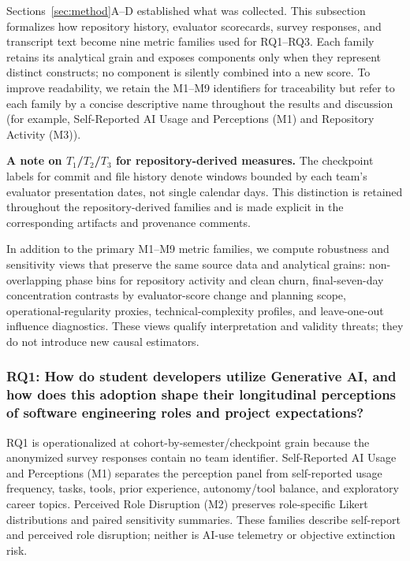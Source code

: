 Sections~\ref{sec:method}A--D established what was collected. This subsection
formalizes how repository history, evaluator scorecards, survey responses, and
transcript text become nine metric families used for RQ1--RQ3. Each family
retains its analytical grain and exposes components only when they represent
distinct constructs; no component is silently combined into a new score.
To improve readability, we retain the M1--M9 identifiers for traceability but
refer to each family by a concise descriptive name throughout the results and
discussion (for example, Self-Reported AI Usage and Perceptions (M1) and
Repository Activity (M3)).

\textbf{A note on $T_1$/$T_2$/$T_3$ for repository-derived measures.} The
checkpoint labels for commit and file history denote windows bounded by each
team's evaluator presentation dates, not single calendar days. This distinction
is retained throughout the repository-derived families and is made explicit in
the corresponding artifacts and provenance comments.

In addition to the primary M1--M9 metric families, we compute robustness and
sensitivity views that preserve the same source data and analytical grains:
non-overlapping phase bins for repository activity and clean churn,
final-seven-day concentration contrasts by evaluator-score change and planning
scope, operational-regularity proxies, technical-complexity profiles, and
leave-one-out influence diagnostics. These views qualify interpretation and
validity threats; they do not introduce new causal estimators.

\subsubsection{RQ1: How do student developers utilize Generative AI, and how does this adoption shape their longitudinal perceptions of software engineering roles and project expectations?}

RQ1 is operationalized at cohort-by-semester/checkpoint grain because the
anonymized survey responses contain no team identifier. Self-Reported AI Usage
and Perceptions (M1) separates the
perception panel from self-reported usage frequency, tasks, tools, prior
experience, autonomy/tool balance, and exploratory career topics. Perceived
Role Disruption (M2) preserves
role-specific Likert distributions and paired sensitivity summaries. These
families describe self-report and perceived role disruption; neither is AI-use
telemetry or objective extinction risk.

